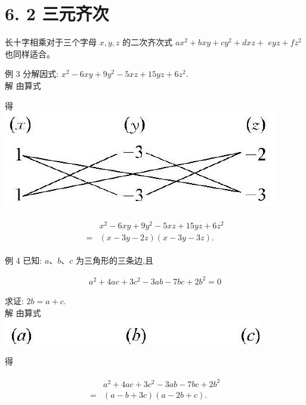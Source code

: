 \documentclass[10pt]{article}
\begin{document}
\section*{6. 2 三元齐次}
长十字相乘对于三个字母 $x, y, z$ 的二次齐次式 $a x^{2}+b x y+c y^{2}+d x z+$ $e y z+f z^{2}$ 也同样适合。

例 3 分解因式: $x^{2}-6 x y+9 y^{2}-5 x z+15 y z+6 z^{2}$.\\
解 由算式

得\\
\includegraphics[max width=\textwidth, center]{2024_10_30_bd799899fef40368a068g-043(1)}

\begin{align*}
\begin{aligned}
& x^{2}-6 x y+9 y^{2}-5 x z+15 y z+6 z^{2} \\
= & (x-3 y-2 z)(x-3 y-3 z) .
\end{aligned}
\end{align*}

例 4 已知: $a 、 b 、 c$ 为三角形的三条边,且

\begin{align*}
a^{2}+4 a c+3 c^{2}-3 a b-7 b c+2 b^{2}=0
\end{align*}

求证: $2 b=a+c$.\\
解 由算式\\
\includegraphics[max width=\textwidth, center]{2024_10_30_bd799899fef40368a068g-043}

得

\begin{align*}
\begin{aligned}
& a^{2}+4 a c+3 c^{2}-3 a b-7 b c+2 b^{2} \\
= & (a-b+3 c)(a-2 b+c) .
\end{aligned}
\end{align*}
\end{document}
